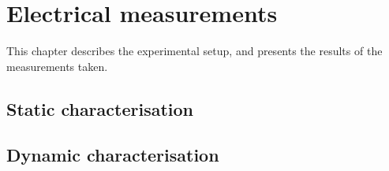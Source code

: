 \chapter{Electrical measurements}
\label{sec:Experiment}

    This chapter describes the experimental setup, and presents the results of the measurements taken.
    
\section{Static characterisation} \label{sec:ExperimentStatic}
\lipsum
   
\section{Dynamic characterisation} \label{sec:ExperimentDynamic}
\lipsum